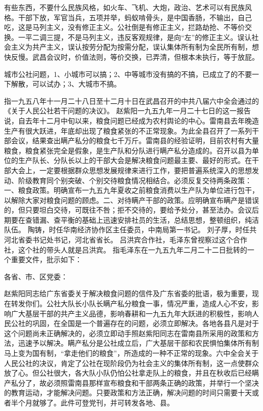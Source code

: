 有些东西，不要什么民族风格，如火车、飞机、大炮，政治、艺术可以有民族风格。干部下放，军官当兵，五项并举，蚂蚁啃骨头，是中国香肠，不输出，自己吃，这是马列主义，没有修正主义。公社倒是有修正主义，拦路劫抢、不等价交换。一平二调三提，不是马列主义，违反客观规律，是向“左”的修正主义。误认社会主义为共产主义，误认按劳分配为按需分配，误认集体所有制为全民所有制，想快反慢。武昌会议时，价值法则，等价交换，已弄清，但根本未执行，等于放屁。

城市公社问题，1、小城市可以搞；2、中等城市没有搞的不搞，已成立了的不要一下解散，可以试办；3、大城市不搞。

\begin{maonote}
指一九五八年十一月二十八日至十二月十日在武昌召开的中共八届六中全会通过的《关于人民公社若干问题的决议》。
赵紫阳一九五九年一月二十七日的这一报告说，自去年十二月中旬以来，粮食问题已经成为农村舆论的中心。雷南县去年晚造生产有很大跃进，年底却出现了粮食紧张的不正常现象。为此全县召开了一系列干部会议，结果查出瞒产私分的粮食七千万斤。雷南县的经验证明，目前农村有大量粮食，粮食紧张完全是假象，是生产队和分队进行瞒产私分造成的。召开以县为单位的生产队长、分队长以上的干部大会是解决粮食问题最主要、最好的形式。在干部大会上，一定要根据群众思想发展规律来进行工作，要把普遍系统深入的思想发动、阶级教育同个别突破、个别交待粮食情况相结合。必须反复交待两条政策：一、粮食政策。明确宣布一九五九年夏收之前粮食消费以生产队为单位进行包干，以解除大家对粮食问题的顾虑。二、对待瞒产干部的政策。应明确宣布瞒产是错误的，但只要坦白交待，可既往不咎；拒不交待的，要给予处分，甚至法办。会议后期要在查错漏、查平衡的基础上迅速安排社员的生活，总结思想，整顿组织，纯洁队伍。
陶铸，时任华南经济协作区主任委员，中南局第一书记。
刘子厚，时任共河北省委书记处书记，河北省省长。
吕洪宾合作社，毛泽东曾视察过这个合作社，这个社的带头人就是吕洪宾。
指毛泽东在一九五九年二月二十二日批转的一个重要文件，批示如下：

各省、市、区党委：

赵紫阳同志给广东省委关于解决粮食问题的信件及广东省委的批语，极为重要，现在转发你们。公社大队长小队长瞒产私分粮食一事，情况严重，造成人心不安，影响广大基层干部的共产主义品德，影响春耕和一九五九年大跃进的积极性，影响人民公社的巩固，在全国是一个普遍存在的问题，必须立即解决。各地各县凡是对于这个问题尚未正确解决的，必须立即动手照赵紫阳同志在雷南县所采用的政策和方法，迅速予以解决。瞒产私分是公社成立后，广大基层干部和农民惧怕集体所有制马上变为国有制，“拿走他们的粮食”，所造成的一种不正常的现象。六中全会关于人民公社的决议，肯定了公社在现阶段仍为社会主义的集体所有制，这一点使群众放了心。但公社很大，各大队小队仍怕公社拿走队上的粮食，并且在秋收后已经瞒产私分了，故必须照雷南县那样宣布粮食和干部两条正确的政策，并举行一个坚决的教育运动，才能解决问题。只要政策和方法正确，解决问题的时间只需要十天或者半个月就够了。此件可登党刊，并可转发各地、县。


\end{maonote}
